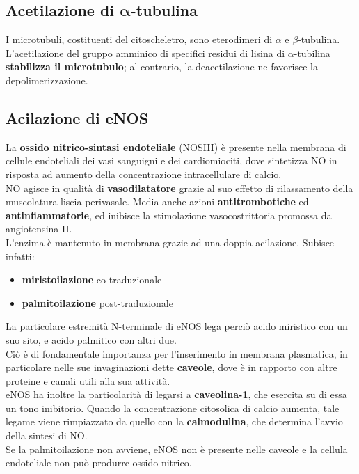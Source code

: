 \documentclass[a4paper, 12pt]{article}
\begin{document}
\subsection{Acetilazione di $\boldsymbol\alpha$-tubulina}
I microtubuli, costituenti del citoscheletro, sono eterodimeri di $\alpha$ e $\beta$-tubulina.\\
L'acetilazione del gruppo amminico di specifici residui di lisina di $\alpha$-tubilina \textbf{stabilizza il microtubulo}; al contrario, la deacetilazione ne favorisce la depolimerizzazione.

\subsection{Acilazione di eNOS}
La \textbf{ossido nitrico-sintasi endoteliale} (NOSIII) è presente nella membrana di cellule endoteliali dei vasi sanguigni e dei cardiomiociti, dove sintetizza NO in risposta ad aumento della concentrazione intracellulare di calcio.\\
NO agisce in qualità di \textbf{vasodilatatore} grazie al suo effetto di rilassamento della muscolatura liscia perivasale. Media anche azioni \textbf{antitrombotiche} ed \textbf{antinfiammatorie}, ed inibisce la stimolazione vasocostrittoria promossa da angiotensina II.\\
L'enzima è mantenuto in membrana grazie ad una doppia acilazione. Subisce infatti:
\begin{itemize}
\item \textbf{miristoilazione} co-traduzionale
\item \textbf{palmitoilazione} post-traduzionale
\end{itemize}
La particolare estremità N-terminale di eNOS lega perciò acido miristico con un suo sito, e acido palmitico con altri due.\\
Ciò è di fondamentale importanza per l'inserimento in membrana plasmatica, in particolare nelle sue invaginazioni dette \textbf{caveole}, dove è in rapporto con altre proteine e canali utili alla sua attività.\\
eNOS ha inoltre la particolarità di legarsi a \textbf{caveolina-1}, che esercita su di essa un tono inibitorio. Quando la concentrazione citosolica di calcio aumenta, tale legame viene rimpiazzato da quello con la \textbf{calmodulina}, che determina l'avvio della sintesi di NO.\\
Se la palmitoilazione non avviene, eNOS non è presente nelle caveole e la cellula endoteliale non può produrre ossido nitrico.
\end{document}
